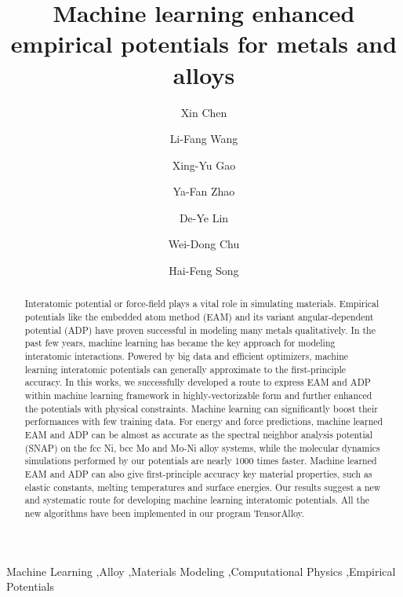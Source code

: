 \documentclass[final,3p,times]{elsarticle}
\begin{document}
\begin{frontmatter}

\title{
    Machine learning enhanced empirical potentials for metals and alloys
}

\author[a]{Xin Chen}
\author[a]{Li-Fang Wang}
\author[a]{Xing-Yu Gao}
\author[b,a]{Ya-Fan Zhao}
\author[b,a]{De-Ye Lin}
\author[a]{Wei-Dong Chu}
\author[a,b]{Hai-Feng Song}

\address[a]{Institute of Applied Physics and Computational Mathematics, 
Beijing 100088, China}
\address[b]{CAEP Software Center for High Performance Numerical Simulation, 
Beijing 100088, China}


% 
%
\begin{abstract}
Interatomic potential or force-field plays a vital role in simulating materials. 
Empirical potentials like the embedded atom method (EAM) and its variant 
angular-dependent potential (ADP) have proven successful in modeling many 
metals qualitatively. In the past few years, machine learning has became the 
key approach for modeling interatomic interactions. Powered by big data and 
efficient optimizers, machine learning interatomic potentials can generally 
approximate to the first-principle accuracy. In this works, we successfully 
developed a route to express EAM and ADP within machine learning framework in 
highly-vectorizable form and further enhanced the potentials with physical 
constraints. Machine learning can significantly boost their performances with 
few training data. 
For energy and force 
predictions, machine lear̦ned EAM and ADP can be almost as accurate as the 
spectral neighbor analysis potential (SNAP) on the fcc Ni, bcc Mo and Mo-Ni 
alloy systems, while the molecular dynamics simulations performed by our 
potentials are nearly 1000 times faster. Machine learned EAM and ADP can also 
give first-principle accuracy key material properties, such as elastic 
constants, melting temperatures and surface energies. Our results suggest a new 
and systematic route for developing machine learning interatomic potentials. All 
the new algorithms have been implemented in our program TensorAlloy.
\end{abstract}

\begin{keyword}
Machine Learning \sep Alloy \sep Materials Modeling \sep Computational Physics 
\sep Empirical Potentials    
\end{keyword}
    
\end{frontmatter}
\end{document}

